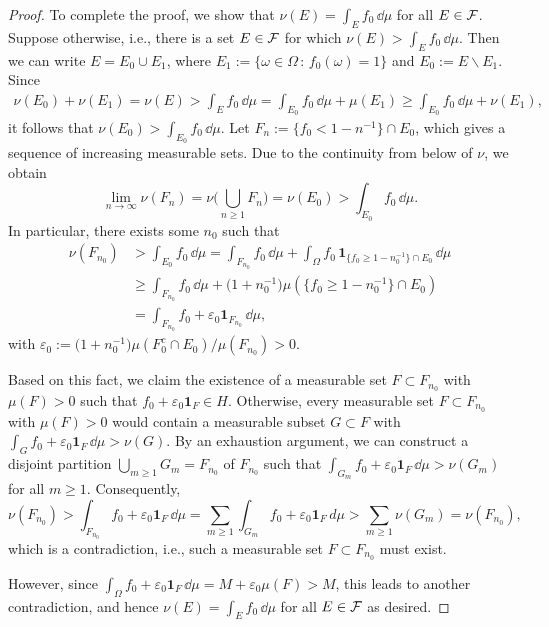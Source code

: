 \begin{proof}
	To complete the proof, we show that $\nu(E)=\int_E f_0\,\dd\mu$ for all $E\in\mathcal F$. Suppose otherwise, i.e., there is a set $E\in\mathcal F$ for which $\nu(E)>\int_E f_0\,\dd\mu$. Then we can write $E=E_0\cup E_1$, where $E_1:= \{ \omega\in\Omega\,:\, f_0(\omega)=1\}$ and $E_0:= E\backslash E_1$. Since
	\begin{align*}
		\nu(E_0) + \nu(E_1) = \nu(E) > \int_E f_0\,\dd\mu = \int_{E_0} f_0\,\dd\mu + \mu(E_1) \ge \int_{E_0} f_0\,\dd\mu + \nu(E_1),
	\end{align*}
	it follows that $\nu(E_0)>\int_{E_0} f_0\,\dd\mu$. Let $F_n:= \{f_0<1-n^{-1}\}\cap E_0$, which gives a sequence of increasing measurable sets. Due to the continuity from below of $\nu$, we obtain
	\[
		\lim_{n\to\infty}\nu(F_n) = \nu\Biggl(\bigcup_{n\ge 1} F_n\Biggr) = \nu(E_0)>\int_{E_0} f_0\,\dd\mu.
	\]
	In particular, there exists some $n_0$ such that
	\begin{align*}
		\nu(F_{n_0}) &> \int_{E_0} f_0\,\dd\mu = \int_{F_{n_0}}f_0\,\dd\mu + \int_\Omega f_0\,\mathbf{1}_{\{f_0\ge 1-n_0^{-1}\}\cap E_0}\,\dd\mu \\
		&\ge \int_{F_{n_0}}f_0\, \dd\mu + \bigl(1 + n_0^{-1}\bigr)\mu(\{f_0\ge 1-n_0^{-1}\}\cap E_0) \\
		&= \int_{F_{n_0}}f_0 + \varepsilon_0\mathbf{1}_{F_{n_0}}\, \dd\mu,
	\end{align*}
	with $\varepsilon_0 := \bigl(1 + n_0^{-1}\bigr)\mu(F_0^c\cap E_0)/\mu(F_{n_0}) >0$. 
	
	Based on this fact, we claim the existence of a measurable set $F\subset F_{n_0}$ with $\mu(F)>0$ such that $f_0 + \varepsilon_0\mathbf{1}_F\in H$. Otherwise, every measurable set $F\subset F_{n_0}$ with $\mu(F)>0$ would contain a measurable subset $G\subset F$ with $\int_G f_0 + \varepsilon_0 \mathbf{1}_F\,\dd\mu > \nu(G)$. By an exhaustion argument, we can construct a disjoint partition $\bigcup_{m\ge 1} G_m = F_{n_0}$ of $F_{n_0}$ such that $\int_{G_m} f_0 + \varepsilon_0 \mathbf{1}_F\,\dd\mu > \nu(G_m)$ for all $m\ge 1$. Consequently,
\[
	\nu(F_{n_0}) > \int_{F_{n_0}}f_0 + \varepsilon_0\mathbf{1}_{F}\, \dd\mu = \sum_{m\ge 1} \int_{G_m} f_0 + \varepsilon_0 \mathbf{1}_F\,d\mu > \sum_{m\ge 1} \nu(G_m) = \nu(F_{n_0}),
\]
which is a contradiction, i.e., such a measurable set $F\subset F_{n_0}$ must exist. 

However, since $\int_\Omega f_0 + \varepsilon_0\mathbf{1}_F\,\dd\mu = M + \varepsilon_0\mu(F) > M$, this leads to another contradiction, and hence $\nu(E)=\int_E f_0\,\dd\mu$ for all $E\in\mathcal F$ as desired.
\end{proof}

